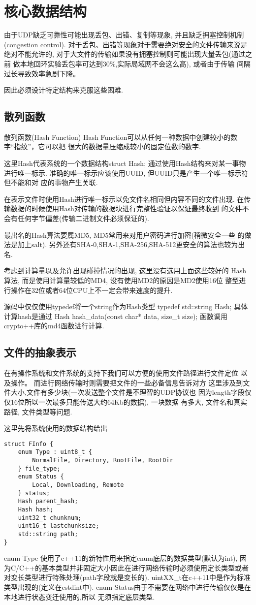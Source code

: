 \chapter{核心数据结构}
由于UDP缺乏可靠性可能出现丢包、出错、复制等现象,
并且缺乏拥塞控制机制(congestion control). 
对于丢包、出错等现象对于需要绝对安全的文件传输来说是绝对不能允许的,
对于大文件的传输如果没有拥塞控制则可能出现大量丢包(通过之前
做本地回环实验丢包率可达到30\%,实际局域网不会这么高), 或者由于传输
间隔过长导致效率急剧下降。

因此必须设计特定结构来克服这些困难.


\section{散列函数}
散列函数(Hash Function)
Hash Function可以从任何一种数据中创建较小的数字``指纹''，它可以把
很大的数据量压缩成较小的固定位数的数字. 

这里Hash代表系统的一个数据结构struct Hash;
通过使用Hash结构来对某一事物进行唯一标示.
准确的唯一标示应该使用UUID, 但UUID只是产生一个唯一标示符但不能和对
应的事物产生关联.

在表示文件时使用Hash进行唯一标示以免文件名相同但内容不同的文件出现.
在传输数据的时候使用Hash对传输的数据块进行完整性验证以保证最终收到
的文件不会有任何字节偏差(传输二进制文件必须保证的).

最出名的Hash算法要属MD5, MD5常用来对用户密码进行加密(稍微安全一些
的做法是加上salt).
另外还有SHA-0,SHA-1,SHA-256,SHA-512更安全的算法也较为出名.

考虑到计算量以及允许出现碰撞情况的出现, 这里没有选用上面这些较好的
Hash算法, 而是使用计算量较低的MD4, 没有使用MD2的原因是MD2使用16位
整型进行操作在32位或者64位CPU上不一定会带来速度的提升.

源码中仅仅使用typedef将一个string作为Hash类型
typedef std::string Hash;
具体计算hash是通过
Hash hash\_data(const char* data, size\_t size);
函数调用crypto++库的md4函数进行计算.


\section{文件的抽象表示}
在有操作系统和文件系统的支持下我们可以方便的使用文件路径进行文件定位
以及操作。
而进行网络传输时则需要把文件的一些必备信息告诉对方
这里涉及到文件大小,文件有多少块(一次发送整个文件是不理智的UDP协议也
因为length字段仅仅16位所以一次最多只能传送大约64Kb的数据), 一块数据
有多大, 文件名和真实路径, 文件类型等问题.

这里先将系统使用的数据结构给出
\begin{lstlisting}
struct FInfo {
	enum Type : uint8_t {
		NormalFile, Directory, RootFile, RootDir 
	} file_type;
	enum Status { 
		Local, Downloading, Remote 
	} status;
	Hash parent_hash;
	Hash hash;
	uint32_t chunknum;
	uint16_t lastchunksize;
	std::string path;
}
\end{lstlisting}
enum Type 使用了c++11的新特性用来指定enum底层的数据类型(默认为int),
因为C/C++的基本类型并非固定大小因此在进行网络传输时必须使用定长类型或者
对变长类型进行特殊处理(path字段就是变长的).
uintXX\_t在c++11中是作为标准类型出现的(定义在cstdint中).
enum Status由于不需要在网络中进行传输仅仅是在本地进行状态变迁使用的,所以
无须指定底层类型.

